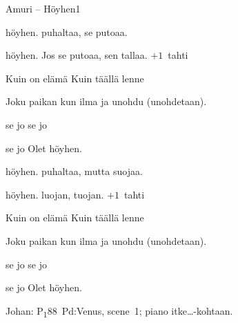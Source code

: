 \documentclass[12pt,a4paper]{article}
\begin{document}
\thispagestyle{empty}
\begin{mysong}{Amuri – Höyhen}{1}


\begin{SBVerse}
   höyhen.  puhaltaa,  se putoaa.

   höyhen. Jos se  putoaa,  sen
  tallaa. {\SBLyricNoteFont $+1$~tahti}
\end{SBVerse}

\begin{SBChorus}
  Kuin  on elämä  Kuin  täällä
  lenne

  Joku  paikan  kun ilma  ja
  unohdu (unohdetaan).

     se jo 
     se jo 

     se jo  Olet
  höyhen.
\end{SBChorus}


\begin{SBVerse}
   höyhen.  puhaltaa, mutta 
  suojaa.

   höyhen.  luojan,  tuojan.
  {\SBLyricNoteFont $+1$~tahti}
\end{SBVerse}

\begin{SBChorus}
  Kuin  on elämä  Kuin  täällä
  lenne

  Joku  paikan  kun ilma  ja
  unohdu (unohdetaan).

     se jo 
     se jo 

     se jo  Olet
  höyhen.
\end{SBChorus}


{\SBLyricNoteFont Johan: P\textsubscript{1}88~Pd:Venus, scene~1; piano
itke\ldots-kohtaan.}

\end{mysong}
\end{document}
